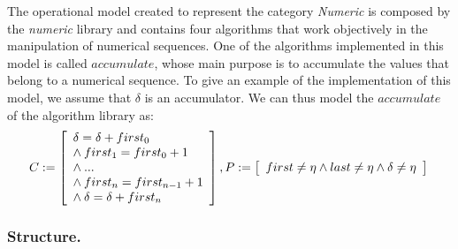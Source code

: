 \documentclass[a4paper]{llncs}
\begin{document}
The operational model created to represent the category \textit{Numeric} is
composed by the \textit{numeric} library and contains four algorithms that work
objectively in the manipulation of numerical sequences. One of the algorithms
implemented in this model is called $accumulate$, whose main purpose is
to accumulate the values that belong to a numerical sequence. To give an example
of the implementation of this model, we assume that $\delta$ is an accumulator.
We can thus model the $accumulate$ of the algorithm library as:
%
\begin{equation}
\label{quantifier-free-formulae-accumulate}
C := \left [ \begin{array}{ll}
            \delta = \delta + first_{0} \\
            \wedge \:first_{1} = first_{0} +1 \\
            \wedge \:... \\
            \wedge \:first_{n} = first_{n-1} +1 \\
            \wedge \:\delta = \delta + first_{n} \\
              \end{array} \right ],  \\
P := \left [ \begin{array}{ll}
            first \neq \eta \wedge last \neq \eta \wedge \delta \neq \eta \\
              \end{array} \right ]  \\
\end{equation}


\subsubsection{Structure.}
\end{document}
